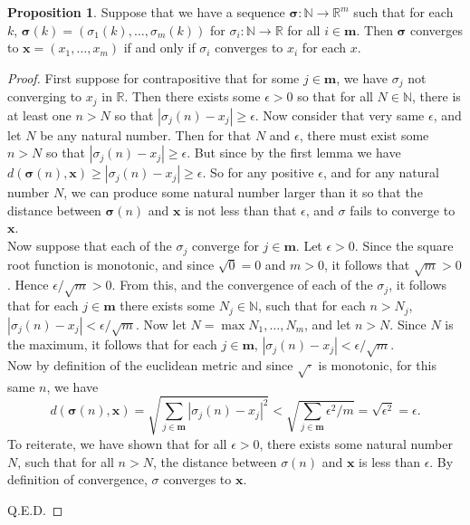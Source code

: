 \documentclass[11pt]{article}
\newcommand{\R}{\mathbb{R}}
\newcommand{\N}{\mathbb{N}}
\theoremstyle{definition}
\newtheorem{proposition}{Proposition}
\begin{document}
\begin{proposition}
Suppose that we have a sequence $\mathbf{\sigma:}\N\to \R^m$ such that for each $k$, $\mathbf{\sigma}(k) = (\sigma_1(k), \dots, \sigma_m(k))$ for $\sigma_i:\N\to \R$ for all $i\in \mathbf{m}$. Then $\mathbf{\sigma}$ converges to $\mathbf{x} = (x_1,\dots,x_m)$ if and only if $\sigma_i$ converges to $x_i$ for each $x$. 
\end{proposition}
\begin{proof}
First suppose for contrapositive that for some $j\in \mathbf{m}$, we have $\sigma_j$ not converging to $x_j$ in $\R$. Then there exists some $\epsilon> 0$ so that for all $N\in \N$, there is at least one $n > N$ so that $|\sigma_j(n) - x_j| \ge \epsilon$. Now consider that very same $\epsilon$, and let $N$ be any natural number. Then for that $N$ and $\epsilon$, there must exist some $n > N$ so that $|\sigma_j(n) - x_j| \ge \epsilon$. But since by the first lemma we have $d(\mathbf{\sigma}(n), \mathbf{x}) \ge |\sigma_j(n) - x_j| \ge \epsilon$. So for any positive $\epsilon$, and for any natural number $N$, we can produce some natural number larger than it so that the distance between $\mathbf{\sigma}(n)$ and $\mathbf{x}$ is not less than that $\epsilon$, and $\sigma$ fails to converge to $\mathbf{x}$. \\

Now suppose that each of the $\sigma_j$ converge for $j\in \mathbf{m}$. Let $\epsilon > 0$. Since the square root function is monotonic, and since $\sqrt{0} = 0$ and $m > 0$, it follows that $\sqrt{m} > 0$. Hence $\epsilon/\sqrt{m} > 0$. From this, and the convergence of each of the $\sigma_j$, it follows that for each $j\in \mathbf{m}$ there exists some $N_j\in \N$, such that for each $n > N_j$, $|\sigma_j(n) - x_j| < \epsilon/\sqrt{m}$. Now let $N = \max{N_1, \dots, N_m}$, and let $n>N$. Since $N$ is the maximum, it follows that for each $j\in \mathbf{m}$, $ |\sigma_j(n) - x_j| < \epsilon / \sqrt{m} $. \\

Now by definition of the euclidean metric and since $\sqrt{\cdot}$ is monotonic, for this same $n$, we have 
$$d(\mathbf{\sigma}(n), \mathbf{x}) = \sqrt{\sum_{j\in \mathbf{m}} |\sigma_j(n) - x_j|^2} < \sqrt{\sum_{j\in \mathbf{m}}\epsilon^2/m} = \sqrt{\epsilon^2} = \epsilon.$$
To reiterate, we have shown that for all $\epsilon > 0$, there exists some natural number $N$, such that for all $n> N$, the distance between $\sigma(n)$ and $\mathbf{x}$ is less than $\epsilon$. By definition of convergence, $\sigma$ converges to $\mathbf{x}$.

Q.E.D.
\end{proof}
\end{document}
